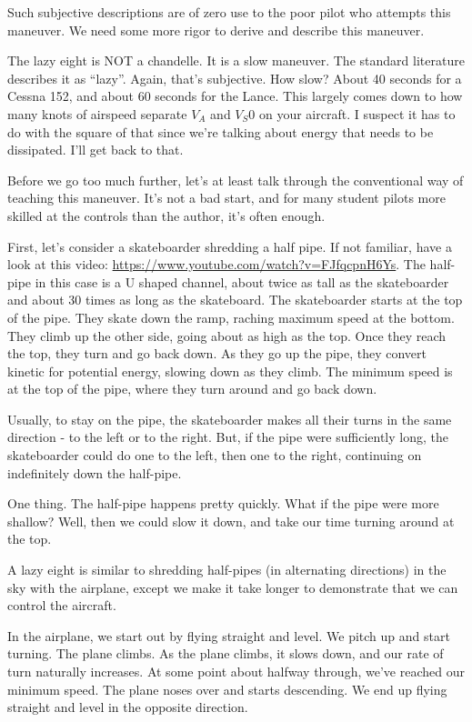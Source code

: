 Such subjective descriptions are of zero use to the poor pilot who attempts this maneuver. We need some more rigor to derive and describe this maneuver.

The lazy eight is NOT a chandelle. It is a slow maneuver. The standard literature describes it as ``lazy''. Again, that's subjective. How slow? About 40 seconds for a Cessna 152, and about 60 seconds for the Lance. This largely comes down to how many knots of airspeed separate $V_A$ and $V_S0$ on your aircraft. I suspect it has to do with the square of that since we're talking about energy that needs to be dissipated. I'll get back to that.

Before we go too much further, let's at least talk through the conventional way of teaching this maneuver. It's not a bad start, and for many student pilots more skilled at the controls than the author, it's often enough.

First, let's consider a skateboarder shredding a half pipe. If not familiar, have a look at this video: \url{https://www.youtube.com/watch?v=FJfqcpnH6Ys}. The half-pipe in this case is a U shaped channel, about twice as tall as the skateboarder and about 30 times as long as the skateboard. The skateboarder starts at the top of the pipe. They skate down the ramp, raching maximum speed at the bottom. They climb up the other side, going about as high as the top. Once they reach the top, they turn and go back down. As they go up the pipe, they convert kinetic for potential energy, slowing down as they climb. The minimum speed is at the top of the pipe, where they turn around and go back down.

Usually, to stay on the pipe, the skateboarder makes all their turns in the same direction - to the left or to the right. But, if the pipe were sufficiently long, the skateboarder could do one to the left, then one to the right, continuing on indefinitely down the half-pipe.

One thing. The half-pipe happens pretty quickly. What if the pipe were more shallow? Well, then we could slow it down, and take our time turning around at the top.

A lazy eight is similar to shredding half-pipes (in alternating directions) in the sky with the airplane, except we make it take longer to demonstrate that we can control the aircraft.

In the airplane, we start out by flying straight and level. We pitch up and start turning. The plane climbs. As the plane climbs, it slows down, and our rate of turn naturally increases. At some point about halfway through, we've reached our minimum speed. The plane noses over and starts descending. We end up flying straight and level in the opposite direction.

